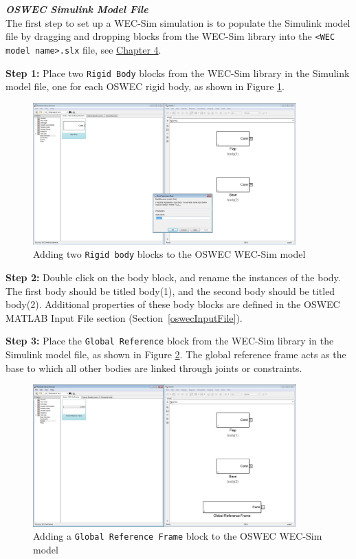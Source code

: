 \textbf{\textit{OSWEC Simulink Model File}}\\
The first step to set up a WEC-Sim simulation is to populate the Simulink model file by dragging and dropping blocks from the WEC-Sim library into the \texttt{<WEC model name>.slx} file, see \hyperlink{chapter.4}{Chapter 4}. 

\textbf{Step 1:} Place two \texttt{Rigid Body} blocks from the WEC-Sim library in the Simulink model file, one for each OSWEC rigid body, as shown in Figure \ref{OSWEC_WECSim_Body2}. 

        \begin{figure}[H]
        \centering
        \includegraphics[width=0.9\textwidth]{application/images/OSWEC_WECSim_Body}
        \caption{Adding two \texttt{Rigid body} blocks to the OSWEC WEC-Sim model}
        \label{OSWEC_WECSim_Body2}
        \end{figure}

\textbf{Step 2:} Double click on the body block, and rename the instances of the body. The first body should be titled body(1), and the second body should be titled body(2). Additional properties of these body blocks are defined in the OSWEC MATLAB Input File section (Section~\ref{oswecInputFile}).

\textbf{Step 3:} Place the \texttt{Global Reference} block from the WEC-Sim library in the Simulink model file, as shown in Figure \ref{OSWEC_WECSim_SeaFloor}. The global reference frame acts as the base to which all other bodies are linked through joints or constraints.

        \begin{figure}[H]
        \centering
        \includegraphics[width=0.9\textwidth]{application/images/OSWEC_WECSim_GlobalRef}
        \caption{Adding  a \texttt{Global Reference Frame} block to the OSWEC WEC-Sim model}
        \label{OSWEC_WECSim_SeaFloor}
        \end{figure}

